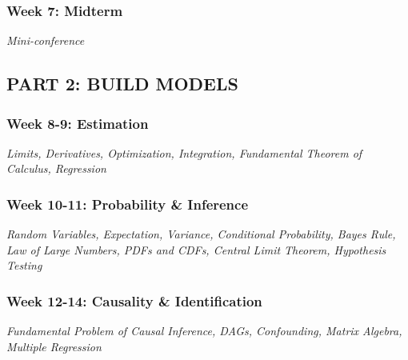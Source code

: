 \documentclass[11pt, letterpaper]{article}
\begin{document}

\subsubsection*{Week 7: Midterm}
\textit{Mini-conference}

\subsection*{PART 2: BUILD MODELS}

\subsubsection*{Week 8-9: Estimation}
\textit{Limits, Derivatives, Optimization, Integration, Fundamental Theorem of Calculus, Regression}

\subsubsection*{Week 10-11: Probability \& Inference}
\textit{Random Variables, Expectation, Variance, Conditional Probability, Bayes Rule, Law of Large Numbers, PDFs and CDFs, Central Limit Theorem, Hypothesis Testing}

\subsubsection*{Week 12-14: Causality \& Identification}
\textit{Fundamental Problem of Causal Inference, DAGs, Confounding, Matrix Algebra, Multiple Regression}

%
\end{document}

